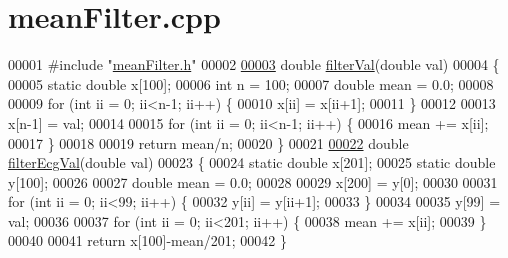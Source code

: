 \hypertarget{meanFilter_8cpp_source}{}\section{mean\+Filter.\+cpp}
\label{meanFilter_8cpp_source}

\begin{DoxyCode}
00001 \textcolor{preprocessor}{#include "\hyperlink{meanFilter_8h}{meanFilter.h}"}
00002 
\hypertarget{meanFilter_8cpp_source.tex_l00003}{}\hyperlink{meanFilter_8h_ab08c7e91b48571e12575c66e10896ade}{00003} \textcolor{keywordtype}{double} \hyperlink{meanFilter_8cpp_a30d3375037ed32fa2ec845d42deebc3d}{filterVal}(\textcolor{keywordtype}{double} val)
00004 \{
00005     \textcolor{keyword}{static} \textcolor{keywordtype}{double} x[100];
00006     \textcolor{keywordtype}{int} n = 100;
00007     \textcolor{keywordtype}{double} mean = 0.0;
00008 
00009     \textcolor{keywordflow}{for} (\textcolor{keywordtype}{int} ii = 0; ii<n-1; ii++) \{
00010         x[ii] = x[ii+1];
00011     \}
00012 
00013     x[n-1] = val;
00014 
00015     \textcolor{keywordflow}{for} (\textcolor{keywordtype}{int} ii = 0; ii<n-1; ii++) \{
00016         mean += x[ii];
00017     \}
00018 
00019     \textcolor{keywordflow}{return} mean/n;
00020 \}
00021 
\hypertarget{meanFilter_8cpp_source.tex_l00022}{}\hyperlink{meanFilter_8h_a7a0a0543e497b3f649b43fa07c19798a}{00022} \textcolor{keywordtype}{double} \hyperlink{meanFilter_8cpp_aff5ded5d4ff3c667ea23c9cdcf76206a}{filterEcgVal}(\textcolor{keywordtype}{double} val)
00023 \{
00024     \textcolor{keyword}{static} \textcolor{keywordtype}{double} x[201];
00025     \textcolor{keyword}{static} \textcolor{keywordtype}{double} y[100];
00026 
00027     \textcolor{keywordtype}{double} mean = 0.0;
00028 
00029     x[200] = y[0];
00030 
00031     \textcolor{keywordflow}{for} (\textcolor{keywordtype}{int} ii = 0; ii<99; ii++) \{
00032         y[ii] = y[ii+1];
00033     \}
00034 
00035     y[99] = val;
00036 
00037     \textcolor{keywordflow}{for} (\textcolor{keywordtype}{int} ii = 0; ii<201; ii++) \{
00038         mean += x[ii];
00039     \}
00040 
00041     \textcolor{keywordflow}{return} x[100]-mean/201;
00042 \}
\end{DoxyCode}
